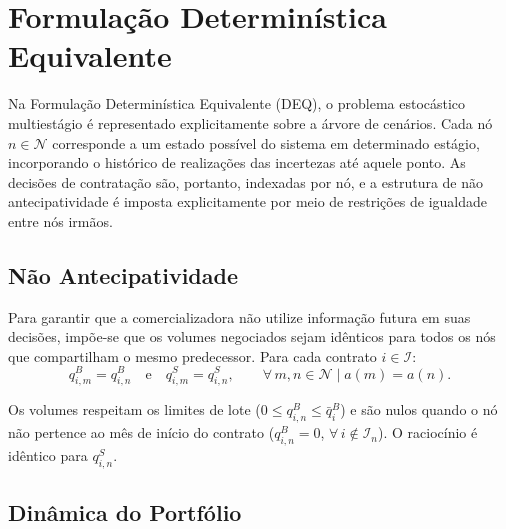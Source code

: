 \section{Formula\c{c}\~ao Determin\'istica Equivalente}
\label{sec:deq}

Na Formula\c{c}\~ao Determin\'istica Equivalente (DEQ), o problema estoc\'astico multiestágio \'e representado explicitamente sobre a \'arvore de cen\'arios. Cada n\'o $n \in \mathcal{N}$ corresponde a um estado poss\'ivel do sistema em determinado est\'agio, incorporando o hist\'orico de realiza\c{c}\~oes das incertezas at\'e aquele ponto. As decis\~oes de contrata\c{c}\~ao s\~ao, portanto, indexadas por n\'o, e a estrutura de n\~ao antecipatividade \'e imposta explicitamente por meio de restri\c{c}\~oes de igualdade entre n\'os irm\~aos.

\subsection{N\~ao Antecipatividade}
\label{subsec:nao_antecipatividade}

Para garantir que a comercializadora n\~ao utilize informa\c{c}\~ao futura em suas decis\~oes, imp\~oe-se que os volumes negociados sejam id\^enticos para todos os n\'os que compartilham o mesmo predecessor. Para cada contrato $i \in \mathcal{I}$:
%
\begin{equation}
  q^B_{i,m} = q^B_{i,n} \quad \text{e} \quad q^S_{i,m} = q^S_{i,n},
  \qquad \forall\, m, n \in \mathcal{N} \mid a(m) = a(n).
  \label{eq:nao_antecipatividade_deq}
\end{equation}

Os volumes respeitam os limites de lote ($0 \leq q^B_{i,n} \leq \bar{q}^B_i$) e s\~ao nulos quando o n\'o n\~ao pertence ao m\^es de in\'icio do contrato ($q^B_{i,n} = 0$, $\forall\, i \notin \mathcal{I}_n$). O racioc\'inio \'e id\^entico para $q^S_{i,n}$.

\subsection{Din\^amica do Portf\'olio}
\label{subsec:dinamica_portfolio}

